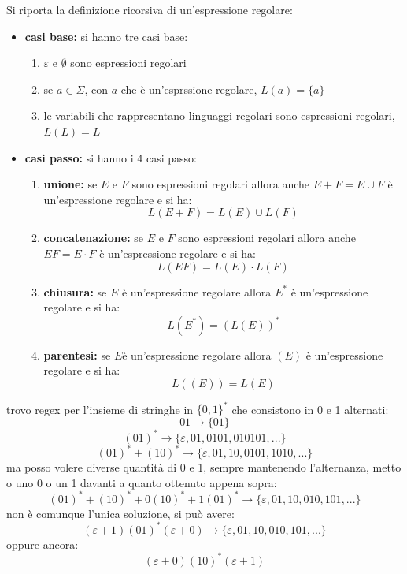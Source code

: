 \begin{definition}
	Si riporta la definizione ricorsiva di un'espressione regolare:
	\begin{itemize}
		\item \textbf{casi base:} si hanno tre casi base:
					\begin{enumerate}
						\item $\varepsilon$ e $\emptyset$ sono espressioni regolari
						\item se $a\in \Sigma$, con $a$ che è un'esprssione regolare, $L(a)=\{a\}$
						\item le variabili che rappresentano linguaggi regolari sono espressioni regolari, $L(L)=L$
					\end{enumerate}
		\item \textbf{casi passo:} si hanno i 4 casi passo:
					\begin{enumerate}
						\item \textbf{unione:} se $E$ e $F$ sono espressioni regolari allora anche $E+F=E\cup F$ è un'espressione regolare e si ha:
									$$L(E+F)=L(E)\cup L(F)$$
						\item \textbf{concatenazione:} se $E$ e $F$ sono espressioni regolari allora anche $EF=E\cdot F$ è un'espressione regolare e si ha:
									$$L(EF)=L(E)\cdot L(F)$$
						\item \textbf{chiusura:} se $E$ è un'espressione regolare allora $E^*$ è un'espressione regolare e si ha:
									$$L(E^*)=(L(E))^*$$
						\item \textbf{parentesi:} se $E$è un'espressione regolare allora $(E)$ è un'espressione regolare e si ha:
									$$L((E))=L(E)$$
					\end{enumerate}
	\end{itemize}
	\newpage
	\begin{example}
		trovo regex per l'insieme di stringhe in $\{0,1\}^*$ che consistono in 0 e 1 alternati:\\
		$$01\to \{01\}$$
		$$(01)^*\to \{\varepsilon, 01, 0101,010101,...\}$$
		$$(01)^*+(10)^*\to\{\varepsilon, 01,10,0101,1010,...\}$$
		ma posso volere diverse quantità di 0 e 1, sempre mantenendo l'alternanza, metto o uno 0 o un 1 davanti a quanto ottenuto appena sopra:
		$$(01)^*+(10)^*+0(10)^*+1(01)^*\to \{\varepsilon,01,10,010,101,...\}$$
		non è comunque l'unica soluzione, si può avere:
		$$(\varepsilon+1)(01)^*(\varepsilon+0)\to \{\varepsilon,01,10,010,101,...\}$$
		oppure ancora:
		$$(\varepsilon+0)(10)^*(\varepsilon+1)$$
	\end{example}
\end{definition}
